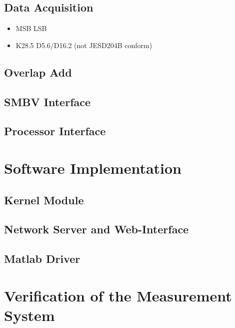 \documentclass[12pt,a4paper,parskip=full,abstract=true,BCOR=10mm,twoside,open=right]{scrreprt}
\begin{document}
\section{Data Acquisition}
\label{sec:acquisition}
\begin{itemize}
    \item MSB \rightarrow LSB
    \item K28.5 D5.6/D16.2 (not JESD204B conform\cite{ltc2274}) \cite{jesd205B.01}
\end{itemize}
\section{Overlap Add}
\label{sec:overlap_add}
\section{SMBV Interface}
\label{sec:smbv_interface}
\section{Processor Interface}


\chapter{Software Implementation}
\label{chap:software}
\section{Kernel Module}
\section{Network Server and Web-Interface}
\section{Matlab Driver}
\label{sec:matlab}



\chapter{Verification of the Measurement System}
\label{chap:verification}
\end{document}
